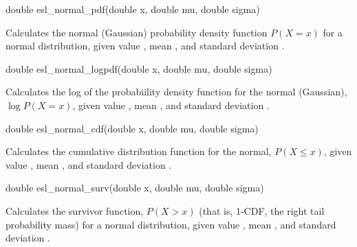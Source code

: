 \begin{sreapi}
\hypertarget{func:esl_normal_pdf()}
{\item[double esl\_normal\_pdf(double x, double mu, double sigma)]}

Calculates the normal (Gaussian) probability density
function $P(X=x)$ for a normal distribution, given
value , mean , and standard deviation .



\hypertarget{func:esl_normal_logpdf()}
{\item[double esl\_normal\_logpdf(double x, double mu, double sigma)]}

Calculates the log of the probabiility density function
for the normal (Gaussian), $\log P(X=x)$, given value
, mean , and standard deviation .



\hypertarget{func:esl_normal_cdf()}
{\item[double esl\_normal\_cdf(double x, double mu, double sigma)]}

Calculates the cumulative distribution function for the
normal, $P(X \leq x)$, given value , mean ,
and standard deviation .



\hypertarget{func:esl_normal_surv()}
{\item[double esl\_normal\_surv(double x, double mu, double sigma)]}

Calculates the survivor function, $P(X>x)$ (that is,
1-CDF, the right tail probability mass) for a normal
distribution, given value , mean , and standard
deviation .



\end{sreapi}

